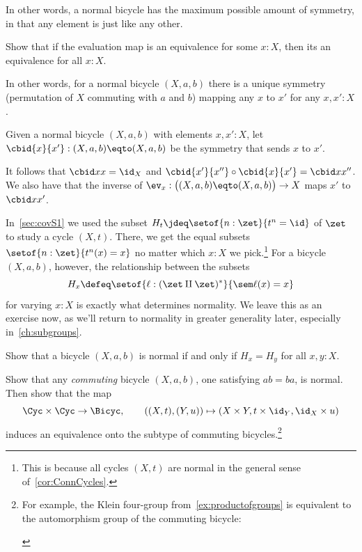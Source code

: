 In other words, a normal bicycle has the maximum possible
amount of symmetry, in that any element is just like any other.
\begin{xca}\label{xca:normal-bicycle-equiv}
  Show that if the evaluation map is an equivalence for some $x:X$,
  then its an equivalence for all $x:X$.
\end{xca}
In other words, for a normal bicycle $(X,a,b)$ there is a unique symmetry
(\ie permutation of $X$ commuting with $a$ and $b$)
mapping any $x$ to $x'$ for any $x,x':X$.
\begin{definition}\label{def:cbid-bicycle}
  Given a normal bicycle $(X,a,b)$ with elements $x,x':X$,
  let $\cbid{x}{x'} : (X,a,b) \eqto (X,a,b)$ be the
  symmetry that sends $x$ to $x'$.
\end{definition}
It follows that $\cbid xx = \id_X$ and $\cbid{x'}{x''} \circ \cbid{x}{x'}
= \cbid x{x''}$.
We also have that the inverse of $\ev_x: \bigl((X,a,b) \eqto (X,a,b)\bigr) \to X$
maps $x'$ to $\cbid x{x'}$.

In~\cref{sec:covS1} we used the subset $H_t \jdeq \setof{n:\zet}{t^n=\id}$
of $\zet$ to study a cycle $(X,t)$. There, we get the equal subsets
$\setof{n:\zet}{t^n(x)=x}$ no matter which $x:X$ we pick.\footnote{%
  This is because all cycles $(X,t)$ are normal
  in the general sense of~\cref{cor:ConnCycles}.}
For a bicycle $(X,a,b)$, however, the relationship between
the subsets
\[
  H_x \defeq \setof{\ell:(\zet\amalg\zet)^*}{\sem\ell(x)=x}
\]
for varying $x:X$ is exactly what determines normality.
We leave this as an exercise now, as we'll return to normality
in greater generality later, especially in~\cref{ch:subgroups}.
\begin{xca}
  Show that a bicycle $(X,a,b)$ is normal if and only if
  $H_x = H_y$ for all $x,y:X$.
\end{xca}
\begin{xca}
  Show that any \emph{commuting} bicycle $(X,a,b)$, \ie
  one satisfying $ab=ba$, is normal.
  Then show that the map
  \[
    \Cyc\times\Cyc\to\Bicyc,\qquad
    ((X,t), (Y,u)) \mapsto (X\times Y, t\times\id_Y, \id_X\times u)
  \]
  induces an equivalence onto the subtype of commuting bicycles.\footnote{%
    For example, the Klein four-group
    from~\cref{ex:productofgroups}
    is equivalent to the automorphism group
    of the commuting bicycle:
  \begin{center}
    \noindent{}
  \end{center}}
\end{xca}

